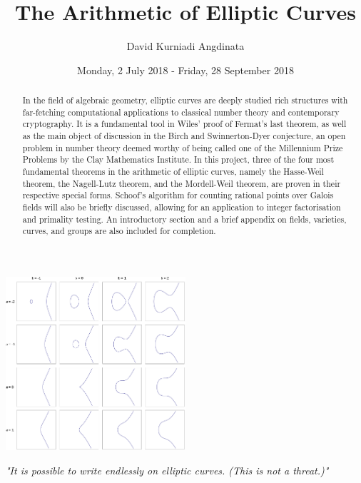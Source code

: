 \documentclass{article}
\title{The Arithmetic of Elliptic Curves}
\author{David Kurniadi Angdinata}
\date{Monday, 2 July 2018 - Friday, 28 September 2018}
\theoremstyle{definition}
\begin{document}
\maketitle

\vspace{1cm}

\begin{center}
\includegraphics*[width=0.5\textwidth]{EllipticCurveCatalog.png}
\end{center}

\vfill

\begin{center}
\emph{"It is possible to write endlessly on elliptic curves. (This is not a threat.)"\cite{lang}} \\
\end{center}

\vspace{1cm}

\begin{abstract}
In the field of algebraic geometry, elliptic curves are deeply studied rich structures with far-fetching computational applications to classical number theory and contemporary cryptography. It is a fundamental tool in Wiles' proof of Fermat's last theorem, as well as the main object of discussion in the Birch and Swinnerton-Dyer conjecture, an open problem in number theory deemed worthy of being called one of the Millennium Prize Problems by the Clay Mathematics Institute. In this project, three of the four most fundamental theorems in the arithmetic of elliptic curves, namely the Hasse-Weil theorem, the Nagell-Lutz theorem, and the Mordell-Weil theorem, are proven in their respective special forms. Schoof's algorithm for counting rational points over Galois fields will also be briefly discussed, allowing for an application to integer factorisation and primality testing. An introductory section and a brief appendix on fields, varieties, curves, and groups are also included for completion.
\end{abstract}
\end{document}

